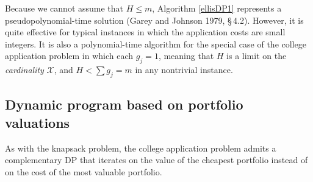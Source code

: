 \documentclass[11pt]{article} %
\theoremstyle{definition}
\begin{document}
Because we cannot assume that $H \leq m$, Algorithm \ref{ellisDP1} represents a pseudopolynomial-time solution (Garey and Johnson 1979, \S\,4.2). However, it is quite effective for typical instances in which the application costs are small integers. It is also a polynomial-time algorithm for the special case of the college application problem in which each $g_j = 1$, meaning that $H$ is a limit on the \emph{cardinality} $\mathcal{X}$, and $H < \sum g_j = m$ in any nontrivial instance. 

\subsection{Dynamic program based on portfolio valuations} \label{dpbasedonportfoliovaluations}

As with the knapsack problem, the college application problem admits a complementary DP that iterates on the value of the cheapest portfolio instead of on the cost of the most valuable portfolio.
\end{document}
